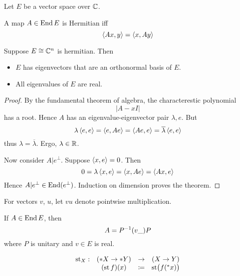 \documentclass{scrartcl}
\newcommand{\conj}[1]{\overline{#1}}
\newcommand{\hyper}[1]{\prescript{*}{}{#1}}
\renewcommand{\define}{\coloneqq}
\DeclareMathOperator{\st}{st}
\begin{document}
  Let $E$ be a vector space over $\mathbb{C}$. 
\begin{defn}[Hermitian]
  A map $A\in \operatorname{End}{E}$ is Hermitian iff
  \[
    \left\langle Ax, y \right\rangle=\left\langle x, Ay \right\rangle
  \]
\end{defn}
\begin{theorem}
  \label{finite-spectral-theorem}
  Suppose $E\cong \mathbb{C}^n$ is hermitian. Then
  \begin{itemize}
  \item $E$ has eigenvectors that are an orthonormal basis of $E$.
  \item All eigenvalues of $E$ are real. 
  \end{itemize}

\end{theorem}
\begin{proof}
  \renewcommand{\vec}{}
  By the fundamental theorem of algebra, the characterestic polynomial
  \[
    |A-xI|
  \]
  has a root. Hence $A$ has an eigenvalue-eigenvector pair $\lambda, \vec e$. But
  \[
    \lambda \inner{\vec e}{\vec e}=\inner{\vec e}{A \vec e}=\inner{A\vec e}{\vec e}=\conj\lambda \inner{\vec e}{\vec e}
  \]
  thus $\lambda = \conj\lambda$. Ergo, $\lambda\in \mathbb{R}$. 

  Now consider $A|e^\perp$. Suppose $\left\langle x, e \right\rangle=0$. Then 
  \[
    0=\lambda\left\langle x, e \right\rangle=\left\langle x, Ae \right\rangle=\left\langle Ax, e \right\rangle
  \]
  Hence $A|e^\perp\in\operatorname{End}(e^\perp)$. Induction on dimension proves the theorem. 
\end{proof}

For vectors $v$, $u$, let $vu$ denote pointwise multiplication. 
\begin{cor}[diagonalization]
  \label{thm:diag}
  If $A\in\operatorname{End} E$, then 
  \[
    A=P^{-1}(v\_)P\\
  \]
  where $P$ is unitary and $v\in E$ is real.
\end{cor}

\begin{defn}
  \[
  \begin{matrix}
   \st_X: &(*X \to *Y) &\to& (X \to Y) \\
    &(\st f)(x) &\define& \st\bigl( f(\hyper x)\bigr)
  \end{matrix}
  \]
\end{defn}
\end{document}

